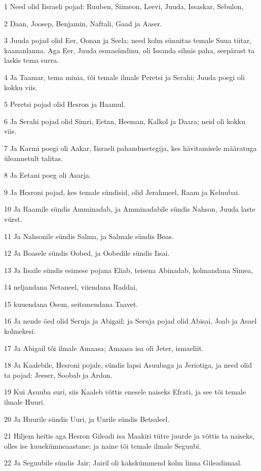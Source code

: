 \par 1 Need olid Iisraeli pojad: Ruuben, Siimeon, Leevi, Juuda, Issaskar, Sebulon,
\par 2 Daan, Joosep, Benjamin, Naftali, Gaad ja Aaser.
\par 3 Juuda pojad olid Eer, Oonan ja Seela; need kolm sünnitas temale Suua tütar, kaananlanna. Aga Eer, Juuda esmasündinu, oli Issanda silmis paha, seepärast ta laskis tema surra.
\par 4 Ja Taamar, tema minia, tõi temale ilmale Peretsi ja Serahi; Juuda poegi oli kokku viis.
\par 5 Peretsi pojad olid Hesron ja Haamul.
\par 6 Ja Serahi pojad olid Simri, Eetan, Heeman, Kalkol ja Daara; neid oli kokku viis.
\par 7 Ja Karmi poegi oli Aakar, Iisraeli pahandusetegija, kes hävitamisele määratuga üleannetult talitas.
\par 8 Ja Eetani poeg oli Asarja.
\par 9 Ja Hesroni pojad, kes temale sündisid, olid Jerahmeel, Raam ja Keluubai.
\par 10 Ja Raamile sündis Amminadab, ja Amminadabile sündis Nahson, Juuda laste vürst.
\par 11 Ja Nahsonile sündis Salma, ja Salmale sündis Boas.
\par 12 Ja Boasele sündis Oobed, ja Oobedile sündis Iisai.
\par 13 Ja Iisaile sündis esimese pojana Eliab, teisena Abinadab, kolmandana Simea,
\par 14 neljandana Netaneel, viiendana Raddai,
\par 15 kuuendana Osem, seitsmendana Taavet.
\par 16 Ja nende õed olid Seruja ja Abigail; ja Seruja pojad olid Abisai, Joab ja Asael kolmekesi.
\par 17 Ja Abigail tõi ilmale Amaasa; Amaasa isa oli Jeter, ismaeliit.
\par 18 Ja Kaalebile, Hesroni pojale, sündis lapsi Asuubaga ja Jeriotiga, ja need olid ta pojad: Jeeser, Soobab ja Ardon.
\par 19 Kui Asuuba suri, siis Kaaleb võttis enesele naiseks Efrati, ja see tõi temale ilmale Huuri.
\par 20 Ja Huurile sündis Uuri, ja Uurile sündis Betsaleel.
\par 21 Hiljem heitis aga Hesron Gileadi isa Maakiri tütre juurde ja võttis ta naiseks, olles ise kuuekümneaastane; ja naine tõi temale ilmale Seguubi.
\par 22 Ja Seguubile sündis Jair; Jairil oli kakskümmend kolm linna Gileadimaal.
